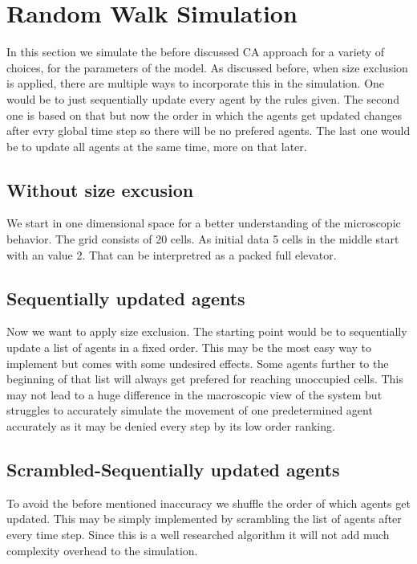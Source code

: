 \newpage
\section{Random Walk Simulation}
In this section we simulate the before discussed CA approach for a variety of choices, for the parameters of the model. 
As discussed before, when size exclusion is applied, there are multiple ways to incorporate this in the simulation. 
One would be to just sequentially update every agent by the rules given.
The second one is based on that but now the order in which the agents get updated changes after evry global time step so there will be no prefered agents. 
The last one would be to update all agents at the same time, more on that later. 

\subsection{Without size excusion}
We start in one dimensional space for a better understanding of the microscopic behavior. 
The grid consists of 20 cells. As initial data 5 cells in the middle start with an value 2.
That can be interpretred as a packed full elevator. 

\subsection{Sequentially updated agents}
Now we want to apply size exclusion. The starting point would be to sequentially update a list of agents in a fixed order. 
This may be the most easy way to implement but comes with some undesired effects. 
Some agents further to the beginning of that list will always get prefered for reaching unoccupied cells.
This may not lead to a huge difference in the macroscopic view of the system but struggles to accurately 
simulate the movement of one predetermined agent accurately as it may be denied every step by its low order ranking.

\subsection{Scrambled-Sequentially updated agents}
To avoid the before mentioned inaccuracy we shuffle the order of which agents get updated. 
This may be simply implemented by scrambling the list of agents after every time step.
Since this is a well researched algorithm it will not add much complexity overhead to the simulation. 

